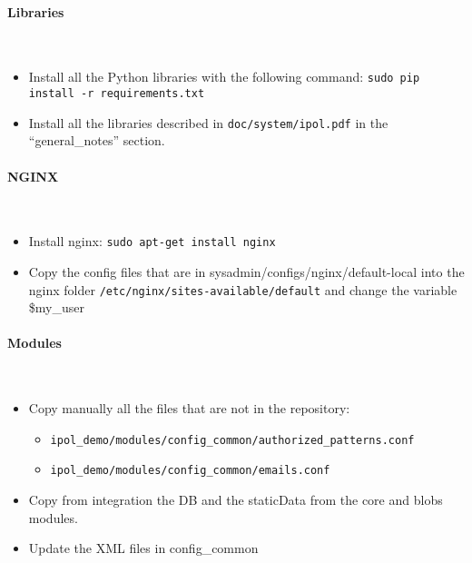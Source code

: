 \paragraph{Libraries} \hspace{0pt} \\
\begin{itemize}
    \item Install all the Python libraries with the following command: {\tt sudo pip install -r requirements.txt}
    \item Install all the libraries described in {\tt doc/system/ipol.pdf} in the ``general\_notes'' section.
\end{itemize}

\paragraph{NGINX} \hspace{0pt} \\
\begin{itemize}
    \item Install nginx: {\tt sudo apt-get install nginx}
    \item Copy the config files that are in sysadmin/configs/nginx/default-local into the nginx folder {\tt/etc/nginx/sites-available/default} and change the variable \$my\_user
\end{itemize}

\paragraph{Modules} \hspace{0pt} \\
\begin{itemize}
    \item Copy manually all the files that are not in the repository:
    \begin{itemize}
        \item {\tt ipol\_demo/modules/config\_common/authorized\_patterns.conf}
        \item {\tt ipol\_demo/modules/config\_common/emails.conf}
    \end{itemize}
    \item Copy from integration the DB and the staticData from the core and blobs modules.
    \item Update the XML files in config\_common
\end{itemize}

